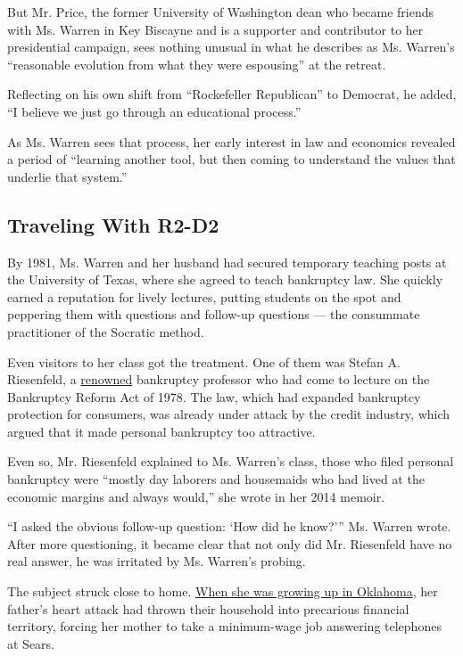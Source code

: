 But Mr. Price, the former University of Washington dean who became
friends with Ms. Warren in Key Biscayne and is a supporter and
contributor to her presidential campaign, sees nothing unusual in what
he describes as Ms. Warren's ``reasonable evolution from what they were
espousing'' at the retreat.

Reflecting on his own shift from ``Rockefeller Republican'' to Democrat,
he added, ``I believe we just go through an educational process.''

As Ms. Warren sees that process, her early interest in law and economics
revealed a period of ``learning another tool, but then coming to
understand the values that underlie that system.''

\hypertarget{traveling-with-r2-d2}{%
\subsection{Traveling With R2-D2}\label{traveling-with-r2-d2}}

By 1981, Ms. Warren and her husband had secured temporary teaching posts
at the University of Texas, where she agreed to teach bankruptcy law.
She quickly earned a reputation for lively lectures, putting students on
the spot and peppering them with questions and follow-up questions ---
the consummate practitioner of the Socratic method.

Even visitors to her class got the treatment. One of them was Stefan A.
Riesenfeld, a
\href{https://www.nytimes.com/1999/03/13/us/stefan-a-riesenfeld-90-expert-on-international-law.html}{renowned}
bankruptcy professor who had come to lecture on the Bankruptcy Reform
Act of 1978. The law, which had expanded bankruptcy protection for
consumers, was already under attack by the credit industry, which argued
that it made personal bankruptcy too attractive.

Even so, Mr. Riesenfeld explained to Ms. Warren's class, those who filed
personal bankruptcy were ``mostly day laborers and housemaids who had
lived at the economic margins and always would,'' she wrote in her 2014
memoir.

``I asked the obvious follow-up question: `How did he know?''' Ms.
Warren wrote. After more questioning, it became clear that not only did
Mr. Riesenfeld have no real answer, he was irritated by Ms. Warren's
probing.

The subject struck close to home.
\href{https://www.nytimes.com/2019/12/23/us/politics/elizabeth-warren-oklahoma-native-american.html}{When
she was growing up in Oklahoma}, her father's heart attack had thrown
their household into precarious financial territory, forcing her mother
to take a minimum-wage job answering telephones at Sears.

